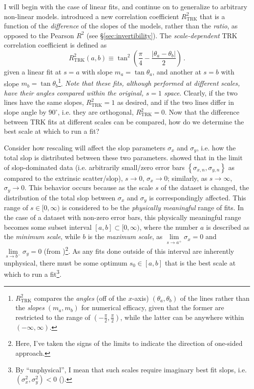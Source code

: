 I will begin with the case of linear fits, and continue on to generalize to arbitrary non-linear models. \textcite{trotter} introduced a new correlation coefficient $R^2_\text{TRK}$ that is a function of the \textit{difference} of the slopes of the models, rather than the \textit{ratio}, as opposed to the Pearson $R^2$ (see \S\ref{sec:invertibility}). The \textit{scale-dependent} TRK correlation coefficient is defined as
\begin{equation}\label{eq:r2TRKab}
R_{\mathrm{TRK}}^{2}(a,b)\equiv \tan^2\left(\frac{\pi}{4}-\frac{\left|\theta_a-\theta_b\right|}{2}\right) \, .
\end{equation}
given a linear fit at $s=a$ with slope $m_a=\tan{\theta_a}$, and another at $s=b$ with slope $m_b=\tan{\theta_b}$\footnote{$R^2_\text{TRK}$ compares the \textit{angles} (off of the $x$-axis) $\left(\theta_a,\theta_b\right)$ of the lines rather than the \textit{slopes} $\left(m_a,m_b\right)$ for numerical efficacy, given that the former are restricted to the range of $\left(-\frac{\pi}{2},\frac{\pi}{2}\right)$, while the latter can be anywhere within $(-\infty,\infty)$.}. \textit{Note that these fits, although performed at different scales, have their angles compared within the original, $s=1$ space}. Clearly, if the two lines have the same slopes, $R^2_\text{TRK}=1$ as desired, and if the two lines differ in slope angle by $90^\circ$, i.e. they are orthogonal, $R^2_\text{TRK}=0$. Now that the difference between TRK fits at different scales can be compared, how do we determine the best scale at which to run a fit?

Consider how rescaling will affect the slop parameters $\sigma_x$ and $\sigma_y$, i.e. how the total slop is distributed between these two parameters. \textcite{trotter} showed that in the limit of slop-dominated data (i.e. arbitrarily small/zero error bars $\left\{\sigma_{x,n},\sigma_{y,n}\right\}$ as compared to the extrinsic scatter/slop), $s\rightarrow 0$, $\sigma_x\rightarrow 0$; similarly, as $s\rightarrow \infty$, $\sigma_y\rightarrow 0$. This behavior occurs because as the scale $s$ of the dataset is changed, the distribution of the total slop between $\sigma_x$ and $\sigma_y$ is correspondingly affected. This range of $s\in[0,\infty)$ is considered to be the \textit{physically meaningful} range of fits. In the case of a dataset with non-zero error bars, this physically meaningful range becomes some subset interval $[a,b]\subset[0,\infty)$, where the number $a$ is described as the \textit{minimum scale}, while $b$ is the \textit{maximum scale}, as $\lim\limits_{s\rightarrow a^+}\sigma_x = 0$ and $\lim\limits_{s\rightarrow b^-}\sigma_y = 0$ (from \cite{trotter})\footnote{Here, I've taken the signs of the limits to indicate the direction of one-sided approach.}. As any fits done outside of this interval are inherently unphysical, there must be some optimum $s_0\in[a,b]$ that is the best scale at which to run a fit\footnote{By ``unphysical'', I mean that such scales require imaginary best fit slops, i.e. $(\sigma_x^2,\sigma_y^2)<0$ (\cite{trotter}).}.

